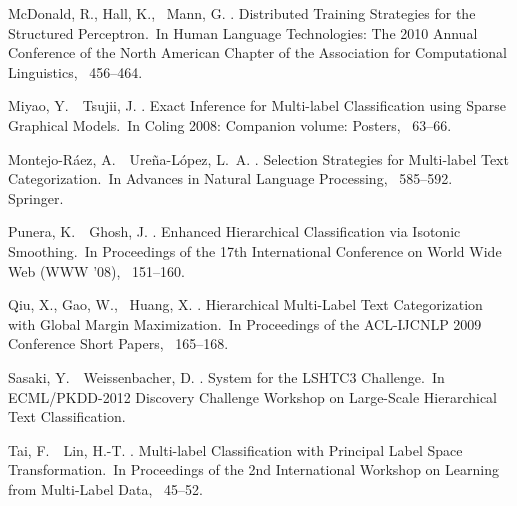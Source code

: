 \documentclass[japanese]{jnlp_1.4}
\begin{document}
\begin{thebibliography}{}
McDonald, R., Hall, K., \BBA\ Mann, G. \BBCP.
\newblock \BBOQ Distributed Training Strategies for the Structured
  {P}erceptron.\BBCQ\
\newblock In {\Bem Human Language Technologies: The 2010 Annual Conference of
  the North American Chapter of the Association for Computational Linguistics},
  \mbox{\BPGS\ 456--464}.

Miyao, Y.\BBACOMMA\ \BBA\ Tsujii, J. \BBOP 2008\BBCP.
\newblock \BBOQ Exact Inference for Multi-label Classification using Sparse
  Graphical Models.\BBCQ\
\newblock In {\Bem Coling 2008: Companion volume: Posters}, \mbox{\BPGS\
  63--66}.

Montejo-R{\'a}ez, A.\BBACOMMA\ \BBA\ Ure{\~n}a-L{\'o}pez, L.~A. \BBOP
  2006\BBCP.
\newblock \BBOQ Selection Strategies for Multi-label Text Categorization.\BBCQ\
\newblock In {\Bem Advances in Natural Language Processing}, \mbox{\BPGS\
  585--592}. Springer.

Punera, K.\BBACOMMA\ \BBA\ Ghosh, J. \BBCP.
\newblock \BBOQ Enhanced Hierarchical Classification via Isotonic
  Smoothing.\BBCQ\
\newblock In {\Bem Proceedings of the 17th International Conference on World
  Wide Web (WWW '08)}, \mbox{\BPGS\ 151--160}.

Qiu, X., Gao, W., \BBA\ Huang, X. \BBCP.
\newblock \BBOQ Hierarchical Multi-Label Text Categorization with Global Margin
  Maximization.\BBCQ\
\newblock In {\Bem Proceedings of the ACL-IJCNLP 2009 Conference Short Papers},
  \mbox{\BPGS\ 165--168}.

Sasaki, Y.\BBACOMMA\ \BBA\ Weissenbacher, D. \BBOP 2012\BBCP.
\newblock \BBOQ {TTI'S} System for the {LSHTC}3 Challenge.\BBCQ\
\newblock In {\Bem ECML/PKDD-2012 Discovery Challenge Workshop on Large-Scale
  Hierarchical Text Classification}.

Tai, F.\BBACOMMA\ \BBA\ Lin, H.-T. \BBOP 2010\BBCP.
\newblock \BBOQ Multi-label Classification with Principal Label Space
  Transformation.\BBCQ\
\newblock In {\Bem Proceedings of the 2nd International Workshop on Learning
  from Multi-Label Data}, \mbox{\BPGS\ 45--52}.


\end{thebibliography}
\end{document}
